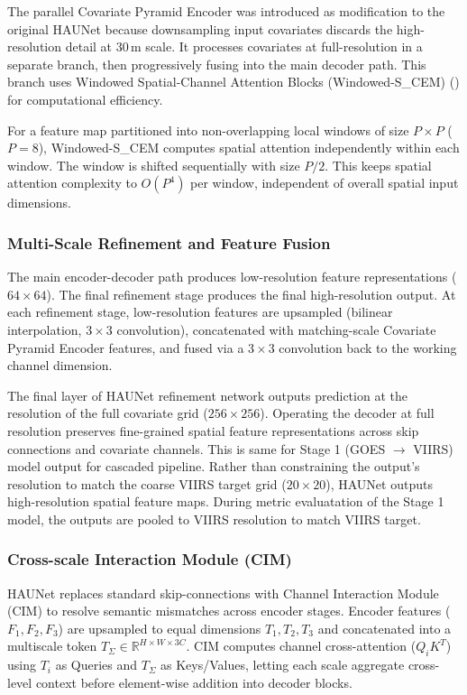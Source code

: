 \documentclass[a4paper, 11pt]{article} %
\begin{document}
The parallel Covariate Pyramid Encoder was introduced as modification to the original HAUNet because downsampling input covariates discards the high-resolution detail at $30\,\text{m}$ scale. It processes covariates at full-resolution in a separate branch, then progressively fusing into the main decoder path. This branch uses Windowed Spatial-Channel Attention Blocks (Windowed-S\_CEM) (\cite{liuSwinTransformerHierarchical2021}) for computational efficiency.

For a feature map partitioned into non-overlapping local windows of size $P \times P$ ($P=8$), Windowed-S\_CEM computes spatial attention independently within each window. The window is shifted sequentially with size $P/2$. This keeps spatial attention complexity to $O(P^4)$ per window, independent of overall spatial input dimensions.

\subsubsection{Multi-Scale Refinement and Feature Fusion}
The main encoder-decoder path produces low-resolution feature representations ($64 \times 64$). The final refinement stage produces the final high-resolution output. At each refinement stage, low-resolution features are upsampled (bilinear interpolation, $3\times3$ convolution), concatenated with matching-scale Covariate Pyramid Encoder features, and fused via a $3\times3$ convolution back to the working channel dimension.

The final layer of HAUNet refinement network outputs prediction at the resolution of the full covariate grid ($256 \times 256$). Operating the decoder at full resolution preserves fine-grained spatial feature representations across skip connections and covariate channels. This is same for Stage 1 (GOES $\to$ VIIRS) model output for cascaded pipeline. Rather than constraining the output's resolution to match the coarse VIIRS target grid ($20 \times 20$), HAUNet outputs high-resolution spatial feature maps. During metric evaluatation of the Stage 1 model, the outputs are pooled to VIIRS resolution to match VIIRS target.

\subsubsection{Cross-scale Interaction Module (CIM)}
HAUNet replaces standard skip-connections with Channel Interaction Module (CIM) to resolve semantic mismatches across encoder stages. Encoder features ($F_1, F_2, F_3$) are upsampled to equal dimensions $T_1, T_2, T_3$ and concatenated into a multiscale token $T_\Sigma \in \mathbb{R}^{H \times W \times 3C}$. CIM computes channel cross-attention ($Q_i K^T$) using $T_i$ as Queries and $T_\Sigma$ as Keys/Values, letting each scale aggregate cross-level context before element-wise addition into decoder blocks.
\end{document}

